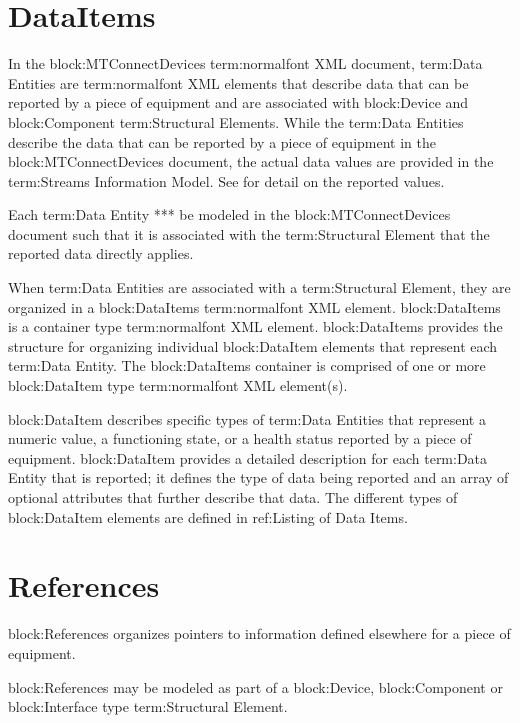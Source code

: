 \section{DataItems}
\label{sec:DataItems}
In the {block:MTConnectDevices} {term:normalfont XML} document, {term:Data Entities} are {term:normalfont XML} elements that describe data that can be reported by a piece of equipment and are associated with {block:Device} and {block:Component} {term:Structural Elements}.   While the {term:Data Entities} describe the data that can be reported by a piece of equipment in the {block:MTConnectDevices} document, the actual data values are provided in the {term:Streams Information Model}.   See  for detail on the reported values.

Each {term:Data Entity} **\should** be modeled in the {block:MTConnectDevices} document such that it is associated with the {term:Structural Element} that the reported data directly applies.

When {term:Data Entities} are associated with a {term:Structural Element}, they are organized in a {block:DataItems} {term:normalfont XML} element.   {block:DataItems} is a container type {term:normalfont XML} element.  {block:DataItems} provides the structure for organizing individual {block:DataItem} elements that represent each {term:Data Entity}. The {block:DataItems} container is comprised of one or more {block:DataItem} type {term:normalfont XML} element(s).

{block:DataItem} describes specific types of {term:Data Entities} that represent a numeric value, a functioning state, or a health status reported by a piece of equipment.   {block:DataItem} provides a detailed description for each {term:Data Entity} that is reported; it defines the type of data being reported and an array of optional attributes that further describe that data.   The different types of {block:DataItem} elements are defined in {ref:Listing of Data Items}.





\section{References}
\label{sec:References}
{block:References} organizes pointers to information defined elsewhere for a piece of equipment.

{block:References} may be modeled as part of a {block:Device}, {block:Component} or {block:Interface} type {term:Structural Element}.


